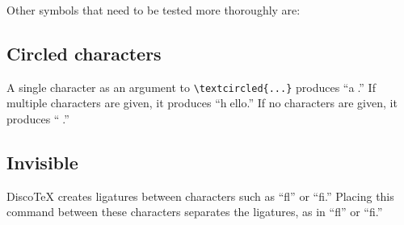 \documentclass[11pt]{article}
\newcommand{\DiscoTeX}[1]{Disco\TeX}
\begin{document}
Other symbols that need to be tested more thoroughly are:

\subsection{Circled characters} A single character as an argument to \verb|\textcircled{...}| produces ``\textcircled{a}.'' If multiple characters are given, it produces ``\textcircled{hello}.'' If no characters are given, it produces ``\textcircled{}.''

    \subsection{Invisible}
\DiscoTeX{} creates ligatures between characters such as ``fl'' or ``fi.'' Placing this command between these characters separates the ligatures, as in ``f\textcompwordmark l'' or ``f\textcompwordmark i.''
\end{document}
